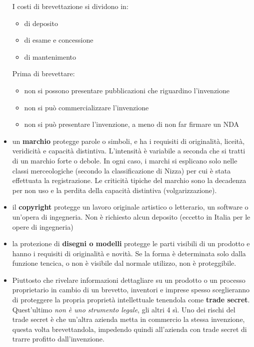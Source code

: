 \documentclass[answers, a4paper, 11pt]{exam}
\begin{document}
\begin{itemize}
    I costi di brevettazione si dividono in:
    \begin{itemize}
        \item di deposito
        \item di esame e concessione
        \item di mantenimento
    \end{itemize}
    Prima di brevettare:
    \begin{itemize}
        \item non si possono presentare pubblicazioni che riguardino l'invenzione
        \item non si può commercializzare l'invenzione
        \item non si può presentare l'invenzione, a meno di non far firmare un NDA
    \end{itemize}
    
    \item un \textbf{marchio} protegge parole o simboli, e ha i requisiti di originalità, liceità, veridicità e capacità distintiva. L'intensità è variabile a seconda che si tratti di un marchio forte o debole. In ogni caso, i marchi si esplicano solo nelle classi merceologiche (secondo la classificazione di Nizza) per cui è stata effettuata la registrazione.
    Le criticità tipiche del marchio sono la decadenza per non uso e la perdita della capacità distintiva (volgarizzazione).
    \item il \textbf{copyright} protegge un lavoro originale artistico o letterario, un software o un'opera di ingegneria. Non è richiesto alcun deposito (eccetto in Italia per le opere di ingegneria)
    \item la protezione di \textbf{disegni o modelli} protegge le parti visibili di un prodotto e hanno i requisiti di originalità e novità. Se la forma è determinata solo dalla funzione tencica, o non è visibile dal normale utilizzo, non è proteggibile.
    \item Piuttosto che rivelare informazioni dettagliare su un prodotto o un processo proprietario in cambio di un brevetto, inventori e imprese spesso sceglieranno di proteggere la propria proprietà intellettuale tenendola come \textbf{trade secret}. 
    Quest'ultimo \emph{non è uno strumento legale}, gli altri 4 sì.
    Uno dei rischi del trade secret è che un'altra azienda metta in commercio la stessa invenzione, questa volta brevettandola, impedendo quindi all'azienda con trade secret di trarre profitto dall'invenzione.
\end{itemize}
\end{document}
